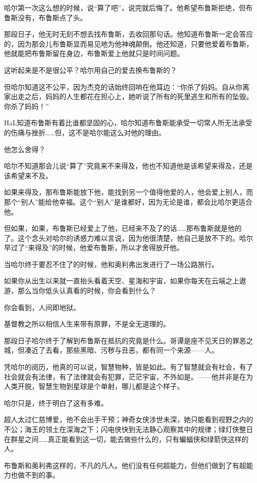 \documentclass[../main]{subfiles}
\begin{document}
哈尔第一次这么想的时候，说“算了吧”，说完就后悔了。他希望布鲁斯拒绝，但布鲁斯没有，布鲁斯点了头。

那段日子，他无时无刻不想去找布鲁斯，去收回那句话。他知道布鲁斯一定会答应的，因为那会儿布鲁斯显而易见地为他神魂颠倒。他还知道，只要他爱着布鲁斯，他就能把布鲁斯留在身边，布鲁斯爱上他就只是时间问题。

这听起来是不是很公平？哈尔用自己的爱去换布鲁斯的？

但哈尔知道这不公平，因为杰克的话始终回响在他耳边：“你杀了妈妈。自从你离家出走之后，妈妈的人生都花在担心上，她听说了所有的死里逃生和所有的坠毁。你杀了妈妈！”

HaL知道布鲁斯有着比谁都坚固的心，哈尔知道布鲁斯能承受一切常人所无法承受的伤痛与挫折……但，这不是哈尔能这么对他的理由。

他怎么舍得？

哈尔不知道那会儿说“算了”究竟来不来得及，他也不知道他是该希望来得及，还是该希望来不及。

如果来得及，那布鲁斯能放下他，能找到另一个值得他爱的人，他会爱上别人，而那个“别人”能给他幸福。这个“别人”是谁都好，因为无论是谁，都会比哈尔更适合他。

但如果，如果，布鲁斯已经爱上了他，已经来不及了的话……那布鲁斯就是他的了。这个念头对哈尔的诱惑力难以言说，因为他很清楚，他自己是放不下的。哈尔早过了“来得及”的时候，他爱布鲁斯，所以才舍得放开他。

当哈尔终于要忍不住了的时候，他和奥利弗出发进行了一场公路旅行。

如果你从出生以来就一直抬头看着天空、星海和宇宙，如果你每天在云端之上遨游，那么当你低头认真看的时候，你会看到什么？

你会看到，人间即地狱。

基督教之所以相信人生来带有原罪，不是全无道理的。

那段日子哈尔终于了解到布鲁斯在抵抗的究竟是什么。哥谭是座不见天日的罪恶之城，但凑近了去看，那些黑暗、污秽与丑恶，都有同一个来源——人。

凭哈尔的阅历，他真的可以说，智慧物种，皆是如此。有了智慧就会有社会，有了社会就会有法律，有了法律就会有犯罪，茫茫宇宙，不外如是。——他并非是在为人类开脱，智慧生物到星球是个单射，哪儿都是这个样子。

哈尔只是，终于明白了这有多难。

超人太过仁慈博爱，他不会出手干预；神奇女侠涉世未深，她只能看到视野之内的不公；海王的领土在深海之下；闪电侠快到无法静心观察其中的规律；绿灯侠整日在群星之间……真正能看到这一切，能去做些什么的，只有蝙蝠侠和绿箭侠这样的人。

布鲁斯和奥利弗这样的，不凡的凡人。他们没有任何超能力，但他们做到了有超能力也做不到的事。
\end{document}
